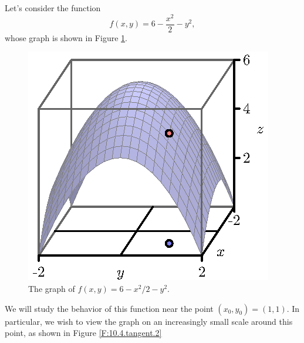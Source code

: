 \begin{pa} \label{PA:10.4} 
  Let's consider the function 
  $$
  f(x,y) = 6 - \frac{x^2}2 - y^2,
  $$
  whose graph is shown in Figure \ref{F:10.4.tangent.1}.  

  \begin{figure}[ht]
    \begin{center}
      \includegraphics{figures/fig_10_4_tangent_1.eps}
    \end{center}
    \caption{The graph of $f(x,y)=6-x^2/2 - y^2$.}
    \label{F:10.4.tangent.1}
  \end{figure}

  We will study the behavior of this function near the point $(x_0,
  y_0) = (1,1)$.  In particular, we wish to view the graph on an
  increasingly small scale around this point, as shown in Figure
  \ref{F:10.4.tangent.2} 


\end{pa}
